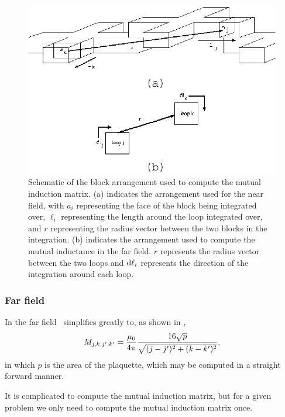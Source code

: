 %
% 
\begin{figure}[p]
\includegraphics[width=5.7in]{figs/jjarray/fig6.ps}
\caption[Block arrangement used to compute mutual induction matrix.]
{Schematic of the block arrangement used to compute the
mutual induction matrix. (a) indicates the arrangement used for the 
near field, with $a_i$ representing the face of the block being
integrated over, $\ell_i$ representing the length around the loop 
integrated over, and $r$ representing the radius vector between the 
two blocks in the integration. (b) indicates the arrangement used 
to compute the mutual inductance in the far field. $r$ represents the
radius vector between the two loops and $\mathrm{d}\ell_i$ represents the direction
of the integration around each loop.}
\label{fig:mutual_induction_matrix_blocks}
\end{figure}

\subsubsection{Far field}

In the far field \ simplifies
greatly to, as shown in ,
%
\begin{equation}
M_{j,k,j',k'} = {\mu_0\over 4 \pi} {16 \sqrt{p} \over \sqrt{(j-j')^2 + (k-k')^2}}, 
\end{equation}
%
in which $p$ is the area of the plaquette,
which may be computed in a straight forward manner. 

It is complicated to compute the mutual induction matrix, but for a given
problem
we only need to compute the mutual induction matrix once.





